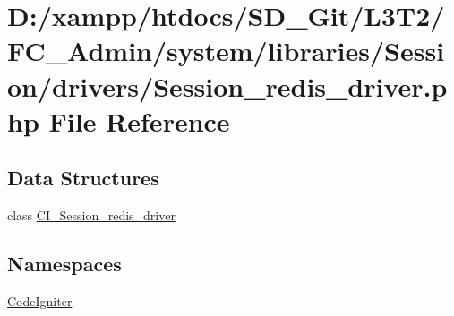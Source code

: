 \hypertarget{_session__redis__driver_8php}{}\section{D\+:/xampp/htdocs/\+S\+D\+\_\+\+Git/\+L3\+T2/\+F\+C\+\_\+\+Admin/system/libraries/\+Session/drivers/\+Session\+\_\+redis\+\_\+driver.php File Reference}
\label{_session__redis__driver_8php}
\subsection*{Data Structures}
\begin{DoxyCompactItemize}
\item 
class \hyperlink{class_c_i___session__redis__driver}{C\+I\+\_\+\+Session\+\_\+redis\+\_\+driver}
\end{DoxyCompactItemize}
\subsection*{Namespaces}
\begin{DoxyCompactItemize}
\item 
 \hyperlink{namespace_code_igniter}{Code\+Igniter}
\end{DoxyCompactItemize}
